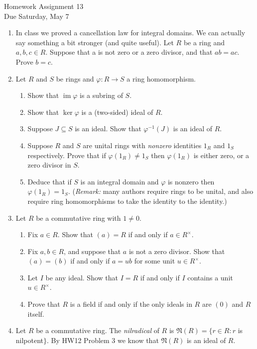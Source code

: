 \documentclass[11pt]{article}
\newcommand{\im}{\operatorname{im}}
\newcommand{\fN}{\mathfrak{N}}
\begin{document}
\begin{center}
\Large {Homework Assignment 13}\\
\small {Due Saturday, May 7}
\end{center}
\begin{enumerate}
  \item{In class we proved a cancellation law for integral domains.  We can actually say something a bit stronger (and quite useful).  Let $R$ be a ring and $a,b,c\in R$.  Suppose that a is not zero or a zero divisor, and that $ab = ac$.  Prove $b=c$.}
  \item{
  Let $R$ and $S$ be rings and $\varphi:R\to S$ a ring homomorphism.
  \begin{enumerate}
    \item{Show that $\im\varphi$ is a subring of $S$.}
    \item{Show that $\ker\varphi$ is a (two-sided) ideal of $R$.}
    \item{Suppose $J\subseteq S$ is an ideal.  Show that $\varphi^{-1}(J)$ is an ideal of $R$.}
    \item{Suppose $R$ and $S$ are unital rings with \textit{nonzero} identities $1_R$ and $1_S$ respectively.  Prove that if $\varphi(1_R)\not=1_S$ then $\varphi(1_R)$ is either zero, or a zero divisor in $S$.}
    \item{Deduce that if $S$ is an integral domain and $\varphi$ is nonzero then $\varphi(1_R)=1_S$.  (\textit{Remark:} many authors require rings to be unital, and also require ring homomorphisms to take the identity to the identity.)}
  \end{enumerate}
  }
  \setcounter{enumi}{5}
  \item{
  Let $R$ be a commutative ring with $1\not=0$.
  \begin{enumerate}
    \item{
    Fix $a\in R$.  Show that $(a)=R$ if and only if $a\in R^\times$.
    }
    \item{
    Fix $a,b\in R$, and suppose that $a$ is not a zero divisor.  Show that $(a)=(b)$ if and only if $a = ub$ for some unit $u\in R^\times$.
    }
    \item{
    Let $I$ be any ideal.  Show that $I=R$ if and only if $I$ contains a unit $u\in R^\times$.
    }
    \item{
    Prove that $R$ is a field if and only if the only ideals in $R$ are $(0)$ and $R$ itself.
    }
  \end{enumerate}
  }
  \item{
  Let $R$ be a commutative ring.  The \textit{nilradical} of $R$ is $\fN(R)=\{r\in R:r$ is nilpotent$\}$.  By HW12 Problem 3 we know that $\fN(R)$ is an ideal of $R$.
}
\end{enumerate}
\end{document}
